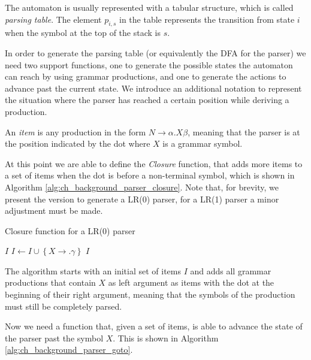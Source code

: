 \noindent
The automaton is usually represented with a tabular structure, which is called \textit{parsing table}. The element $p_{i,s}$ in the table represents the transition from state $i$ when the symbol at the top of the stack is $s$.

In order to generate the parsing table (or equivalently the DFA for the parser) we need two support functions, one to generate the possible states the automaton can reach by using grammar productions, and one to generate the actions to advance past the current state. We introduce an additional notation to represent the situation where the parser has reached a certain position while deriving a production.

\begin{definition}
	An \textit{item} is any production in the form $N \rightarrow \alpha.X\beta$, meaning that the parser is at the position indicated by the dot where $X$ is a grammar symbol.
\end{definition}

At this point we are able to define the \textit{Closure} function, that adds more items to a set of items when the dot is before a non-terminal symbol, which is shown in Algorithm \ref{alg:ch_background_parser_closure}. Note that, for brevity, we present the version to generate a LR(0) parser, for a LR(1) parser a minor adjustment must be made.

\begin{algorithm}
	\caption{Closure function for a LR(0) parser}
	\label{alg:ch_background_parser_closure}
	\begin{algorithmic}
		 {$I$}
			\Repeat
						\State $I \gets I \cup \left\lbrace X \rightarrow .\gamma \right\rbrace$
					\EndFor
				\EndFor
			\State \Return $I$
		\EndFunction
	\end{algorithmic}
\end{algorithm}

The algorithm starts with an initial set of items $I$ and adds all grammar productions that contain $X$ as left argument as items with the dot at the beginning of their right argument, meaning that the symbols of the production must still be completely parsed.
 
Now we need a function that, given a set of items, is able to advance the state of the parser past the symbol $X$. This is shown in Algorithm \ref{alg:ch_background_parser_goto}.

